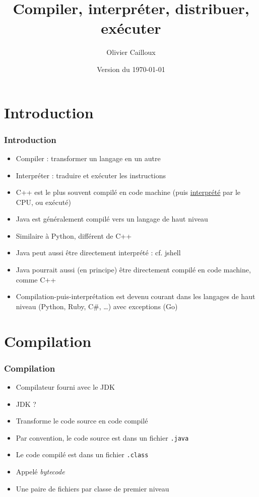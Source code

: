 \documentclass[english, french]{beamer}
\title{Compiler, interpréter, distribuer, exécuter}
\author{Olivier Cailloux}
\institute[LAMSADE]{LAMSADE, Université Paris-Dauphine}
\date{Version du \today}
\begin{document}
\begin{frame}[plain]
	\titlepage
\end{frame}
\addtocounter{framenumber}{-1}

\section{Introduction}
\begin{frame}
	\frametitle{Introduction}
	\begin{itemize}
		\item Compiler : transformer un langage en un autre
		\item Interpréter : traduire et exécuter les instructions
		\item C++ est le plus souvent compilé en code machine (puis \href{https://stackoverflow.com/a/9547498/}{interprété} par le CPU, ou \og{}exécuté\fg{})
		\item Java est généralement compilé vers un langage de haut niveau
		\item Similaire à Python, différent de C++
		\item Java peut aussi être directement interprété : cf. jshell
		\item Java pourrait aussi (en principe) être directement compilé en code machine, comme C++
		\item Compilation-puis-interprétation est devenu courant dans les langages de haut niveau (Python, Ruby, C\#, …) avec exceptions (Go)
	\end{itemize}
\end{frame}

\section{Compilation}
\begin{frame}
	\frametitle{Compilation}
	\begin{itemize}
		\item Compilateur fourni avec le JDK
		\item JDK ? \onslide<2>{Java Development Kit}
		\item Transforme le code source en code compilé
		\item Par convention, le code source est dans un fichier \texttt{.java}
		\item Le code compilé est dans un fichier \texttt{.class}
		\item Appelé \emph{bytecode}
		\item Une paire de fichiers par classe {\tiny de premier niveau}
	\end{itemize}
\end{frame}
\end{document}
